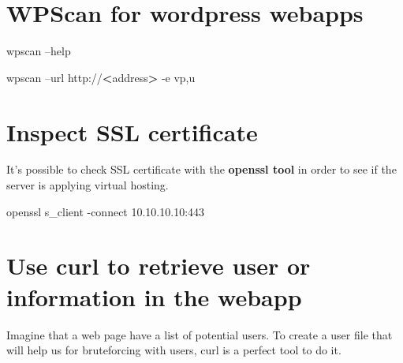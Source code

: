 \documentclass{assets/ipesethesis}
\newenvironment{Shaded}{\begin{snugshade}}{\end{snugshade}}
\newcommand{\ExtensionTok}[1]{#1}
\newcommand{\FunctionTok}[1]{\textcolor[rgb]{0.00,0.00,0.00}{#1}}
\newcommand{\KeywordTok}[1]{\textcolor[rgb]{0.13,0.29,0.53}{\textbf{#1}}}
\newcommand{\NormalTok}[1]{#1}
\newcommand{\OperatorTok}[1]{\textcolor[rgb]{0.81,0.36,0.00}{\textbf{#1}}}
\newcommand{\StringTok}[1]{\textcolor[rgb]{0.31,0.60,0.02}{#1}}
\begin{document}
\hypertarget{wpscan-for-wordpress-webapps}{%
\section*{WPScan for wordpress webapps}\label{wpscan-for-wordpress-webapps}}

\begin{Shaded}
\begin{Highlighting}[]
\ExtensionTok{wpscan}\NormalTok{ --help}

\ExtensionTok{wpscan}\NormalTok{ --url http://}\OperatorTok{<}\NormalTok{address}\OperatorTok{>}\NormalTok{ -e vp,u}
\end{Highlighting}
\end{Shaded}

\hypertarget{inspect-ssl-certificate}{%
\section*{Inspect SSL certificate}\label{inspect-ssl-certificate}}

It's possible to check SSL certificate with the \textbf{openssl tool} in order to see if the server is applying virtual hosting.

\begin{Shaded}
\begin{Highlighting}[]
\ExtensionTok{openssl}\NormalTok{ s_client -connect 10.10.10.10:443}
\end{Highlighting}
\end{Shaded}

\hypertarget{use-curl-to-retrieve-user-or-information-in-the-webapp}{%
\section*{Use curl to retrieve user or information in the webapp}\label{use-curl-to-retrieve-user-or-information-in-the-webapp}}

Imagine that a web page have a list of potential users. To create a user file that will help us for bruteforcing with users,
curl is a perfect tool to do it.

\begin{Shaded}
\end{Shaded}
\end{document}
